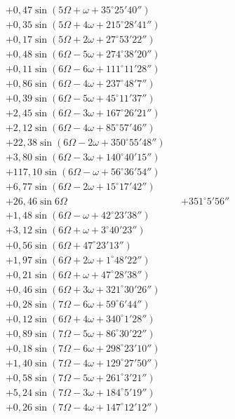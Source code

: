 \documentclass[10pt,a4paper]{article}
\begin{document}
\begin{align*}
&+ 0,47 \sin(5\Omega + \omega + 35^{\circ}25'40'') \\
&+ 0,35 \sin(5\Omega + 4\omega + 215^{\circ}28'41'') \\
&+ 0,17 \sin(5\Omega + 2\omega + 27^{\circ}53'22'') \\
&+ 0,48 \sin(6\Omega - 5\omega + 274^{\circ}38'20'') \\
&+ 0,11 \sin(6\Omega - 6\omega + 111^{\circ}11'28'') \\
&+ 0,86 \sin(6\Omega - 4\omega + 237^{\circ}48'7'') \\
&+ 0,39 \sin(6\Omega - 5\omega + 45^{\circ}11'37'') \\
&+ 2,45 \sin(6\Omega - 3\omega + 167^{\circ}26'21'') \\
&+ 2,12 \sin(6\Omega - 4\omega + 85^{\circ}57'46'') \\
&+ 22,38 \sin(6\Omega - 2\omega + 350^{\circ}55'48'') \\
&+ 3,80 \sin(6\Omega - 3\omega + 140^{\circ}40'15'') \\
&+ 117,10 \sin(6\Omega - \omega + 56^{\circ}36'54'') \\
&+ 6,77 \sin(6\Omega - 2\omega + 15^{\circ}17'42'') \\
&+ 26,46 \sin 6\Omega &&+ 351^{\circ}5'56'' \\
&+ 1,48 \sin(6\Omega - \omega + 42^{\circ}23'38'') \\
&+ 3,12 \sin(6\Omega + \omega + 3^{\circ}40'23'') \\
&+ 0,56 \sin(6\Omega + 47^{\circ}23'13'') \\
&+ 1,97 \sin(6\Omega + 2\omega + 1^{\circ}48'22'') \\
&+ 0,21 \sin(6\Omega + \omega + 47^{\circ}28'38'') \\
&+ 0,46 \sin(6\Omega + 3\omega + 321^{\circ}30'26'') \\
&+ 0,28 \sin(7\Omega - 6\omega + 59^{\circ}6'44'') \\
&+ 0,12 \sin(6\Omega + 4\omega + 340^{\circ}1'28'') \\
&+ 0,89 \sin(7\Omega - 5\omega + 86^{\circ}30'22'') \\
&+ 0,18 \sin(7\Omega - 6\omega + 298^{\circ}23'10'') \\
&+ 1,40 \sin(7\Omega - 4\omega + 129^{\circ}27'50'') \\
&+ 0,58 \sin(7\Omega - 5\omega + 261^{\circ}3'21'') \\
&+ 5,24 \sin(7\Omega - 3\omega + 184^{\circ}5'19'') \\
&+ 0,26 \sin(7\Omega - 4\omega + 147^{\circ}12'12'') \\

\end{align*}
\end{document}
